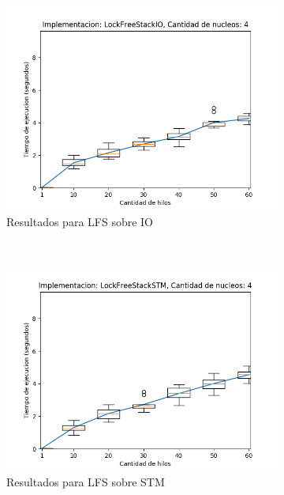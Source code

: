 \begin{appendices}
\begin{figure}[H]
\begin{subfigure}[b]{0.49\textwidth}
        \includegraphics[width=\textwidth]{images/numberOfThreads/plots/expLFSIO-4}
        \caption{Resultados para LFS sobre IO}
        \label{subfig:numberOfThreads-lfsio-4}
    \end{subfigure}
    ~
    \begin{subfigure}[b]{0.49\textwidth}
        \includegraphics[width=\textwidth]{images/numberOfThreads/plots/expLFSSTM-4}
        \caption{Resultados para LFS sobre STM}
        \label{subfig:numberOfThreads-lfsstm-4}
    \end{subfigure}
    \begin{subfigure}[b]{0.49\textwidth}

\end{subfigure}
\end{figure}
\end{appendices}

